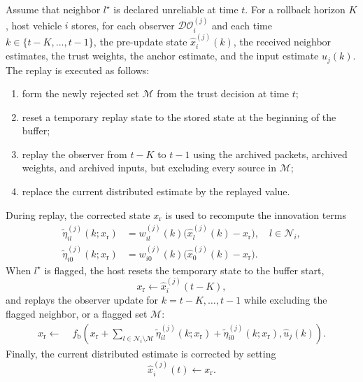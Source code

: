 \documentclass[journal,twoside]{IEEEtran}
\def\N{\mathcal{N}} %
\def\DO{\mathcal{DO}} %
\begin{document}
Assume that neighbor $l^{\star}$ is declared unreliable at time $t$. For a rollback horizon $K$, host vehicle $i$ stores, for each observer $\DO_i^{(j)}$ and each time $k\in\{t-K,\ldots,t-1\}$, the pre-update state $\hat{x}_i^{(j)}(k)$, the received neighbor estimates, the trust weights, the anchor estimate, and the input estimate $\hat{u}_j(k)$. The replay is executed as follows:
\begin{enumerate}
    \item form the newly rejected set $\mathcal{M}$ from the trust decision at time $t$;
    \item reset a temporary replay state to the stored state at the beginning of the buffer;
    \item replay the observer from $t-K$ to $t-1$ using the archived packets, archived weights, and archived inputs, but excluding every source in $\mathcal{M}$;
    \item replace the current distributed estimate by the replayed value.
\end{enumerate}
During replay, the corrected state $x_{\mathrm{r}}$ is used to recompute the innovation terms
\begin{align}
\tilde{\eta}_{il}^{(j)}(k;x_{\mathrm{r}})
&= w_{il}^{(j)}(k)
\big(\hat{x}_l^{(j)}(k)-x_{\mathrm{r}}\big),\quad l\in\N_i, \\
\tilde{\eta}_{i0}^{(j)}(k;x_{\mathrm{r}})
&= w_{i0}^{(j)}(k)
\big(\hat{x}_0^{(j)}(k)-x_{\mathrm{r}}\big).
\end{align}
When $l^{\star}$ is flagged, the host resets the temporary state to the buffer start,
\begin{equation}
    x_{\mathrm{r}} \leftarrow \hat{x}_i^{(j)}(t-K),
\end{equation}
and replays the observer update for $k=t-K,\ldots,t-1$ while excluding the flagged neighbor, or a flagged set $\mathcal{M}$:
\begin{equation}
\begin{aligned}
x_{\mathrm{r}} \leftarrow\;&
f_{\text{b}}\!\left(
x_{\mathrm{r}}
+\sum_{l\in\N_i\setminus\mathcal{M}}\tilde{\eta}_{il}^{(j)}(k;x_{\mathrm{r}})
+ \tilde{\eta}_{i0}^{(j)}(k;x_{\mathrm{r}}),
\hat{u}_j(k)\right).
\end{aligned}
\label{eq_rollback_replay}
\end{equation}
Finally, the current distributed estimate is corrected by setting
\begin{equation}
    \hat{x}_i^{(j)}(t)\leftarrow x_{\mathrm{r}}.
\end{equation}
\end{document}

